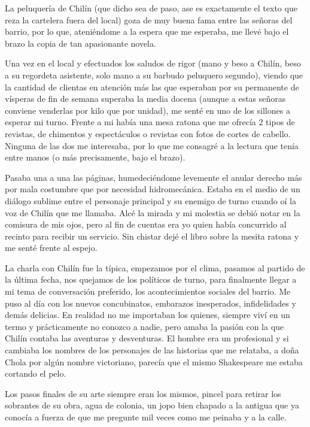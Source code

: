 \documentclass[11pt,twoside,openright,a6paper]{book}
\begin{document}
La peluquería de Chilín (que dicho sea de paso, ase es exactamente el texto que reza la cartelera fuera del local) goza de muy buena fama entre las señoras del barrio, por lo que, ateniéndome a la espera que me esperaba, me llevé bajo el brazo la copia de tan apasionante novela.

Una vez en el local y efectuados los saludos de rigor (mano y beso a Chilín, beso a su regordeta asistente, solo mano a su barbudo peluquero segundo), viendo que la cantidad de clientas en atención más las que esperaban por su permanente de vísperas de fin de semana superaba la media docena (aunque a estas señoras conviene venderlas por kilo que por unidad), me senté en uno de los sillones a esperar mi turno. Frente a mi había una mesa ratona que me ofrecía 2 tipos de revistas, de chimentos y espectáculos o revistas con fotos de cortes de cabello. Ninguna de las dos me interesaba, por lo que me consagré a la lectura que tenía entre manos (o más precisamente, bajo el brazo).

Pasaba una a una las páginas, humedeciéndome levemente el anular derecho más por mala costumbre que por necesidad hidromecánica. Estaba en el medio de un diálogo sublime entre el personaje principal y su enemigo de turno cuando oí la voz de Chilín que me llamaba. Alcé la mirada y mi molestia se debió notar en la comisura de mis ojos, pero al fin de cuentas era yo quien había concurrido al recinto para recibir un servicio. Sin chistar dejé el libro sobre la mesita ratona y me senté frente al espejo.

La charla con Chilín fue la típica, empezamos por el clima, pasamos al partido de la última fecha, nos quejamos de los políticos de turno, para finalmente llegar a mi tema de conversación preferido, los acontecimientos sociales del barrio. Me puso al día con los nuevos concubinatos, embarazos inesperados, infidelidades y demás delicias. En realidad no me importaban los quienes, siempre viví en un termo y prácticamente no conozco a nadie, pero amaba la pasión con la que Chilín contaba las aventuras y desventuras. El hombre era un profesional y si cambiaba los nombres de los personajes de las historias que me relataba, a doña Chola por algún nombre victoriano, parecía que el mismo Shakespeare me estaba cortando el pelo.

Los pasos finales de su arte siempre eran los mismos, pincel para retirar los sobrantes de su obra, agua de colonia, un jopo bien chapado a la antigua que ya conocía a fuerza de que me pregunte mil veces como me peinaba y a la calle.
\end{document}
